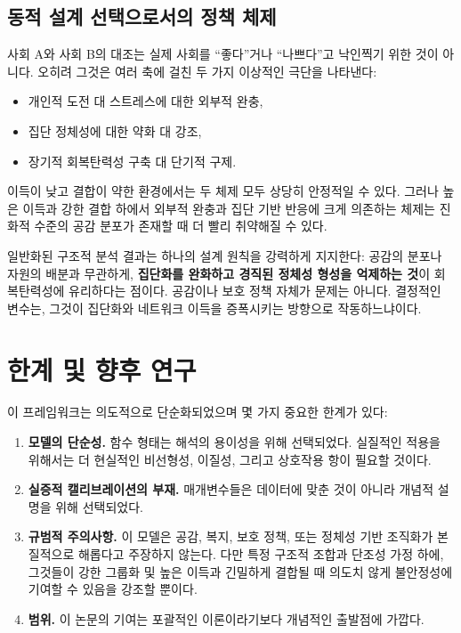 \documentclass[11pt]{article}
\theoremstyle{plain}
\begin{document}
\subsection{동적 설계 선택으로서의 정책 체제}

사회 A와 사회 B의 대조는 실제 사회를 ``좋다''거나 ``나쁘다''고 낙인찍기 위한 것이 아니다.
오히려 그것은 여러 축에 걸친 두 가지 이상적인 극단을 나타낸다:
\begin{itemize}
  \item 개인적 도전 대 스트레스에 대한 외부적 완충,
  \item 집단 정체성에 대한 약화 대 강조,
  \item 장기적 회복탄력성 구축 대 단기적 구제.
\end{itemize}

이득이 낮고 결합이 약한 환경에서는 두 체제 모두 상당히 안정적일 수 있다.
그러나 높은 이득과 강한 결합 하에서 외부적 완충과 집단 기반 반응에 크게 의존하는 체제는 진화적 수준의 공감 분포가 존재할 때 더 빨리 취약해질 수 있다.

일반화된 구조적 분석 결과는 하나의 설계 원칙을 강력하게 지지한다: 공감의 분포나 자원의 배분과 무관하게, \textbf{집단화를 완화하고 경직된 정체성 형성을 억제하는 것}이 회복탄력성에 유리하다는 점이다.
공감이나 보호 정책 자체가 문제는 아니다. 결정적인 변수는, 그것이 집단화와 네트워크 이득을 증폭시키는 방향으로 작동하느냐이다.

\section{한계 및 향후 연구}

이 프레임워크는 의도적으로 단순화되었으며 몇 가지 중요한 한계가 있다:

\begin{enumerate}
  \item \textbf{모델의 단순성.}  
  함수 형태는 해석의 용이성을 위해 선택되었다.
  실질적인 적용을 위해서는 더 현실적인 비선형성, 이질성, 그리고 상호작용 항이 필요할 것이다.

  \item \textbf{실증적 캘리브레이션의 부재.}  
  매개변수들은 데이터에 맞춘 것이 아니라 개념적 설명을 위해 선택되었다.

  \item \textbf{규범적 주의사항.}  
  이 모델은 공감, 복지, 보호 정책, 또는 정체성 기반 조직화가 본질적으로 해롭다고 주장하지 않는다.
  다만 특정 구조적 조합과 단조성 가정 하에, 그것들이 강한 그룹화 및 높은 이득과 긴밀하게 결합될 때 의도치 않게 불안정성에 기여할 수 있음을 강조할 뿐이다.

  \item \textbf{범위.}  
  이 논문의 기여는 포괄적인 이론이라기보다 개념적인 출발점에 가깝다.
\end{enumerate}
\end{document}
